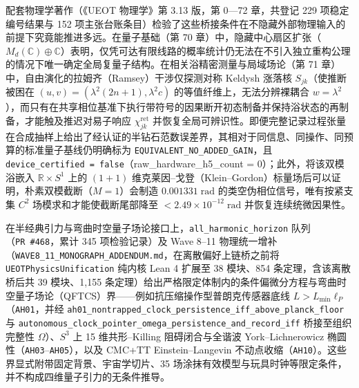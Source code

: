 \documentclass[
  11pt,
  oneside]{book}
\begin{document}
配套物理学著作（《UEOT 物理学》第 3.13 版，第 0---72 章，共登记 229 项稳定编号结果与 152 项主张台账条目）检验了这些桥接条件在不隐藏外部物理输入的前提下究竟能推进多远。在量子基础（第 70 章）中，隐藏中心扇区扩张（\(M_d(\mathbb{C}) \oplus \mathbb{C}\)）表明，仅凭可达有限线路的概率统计仍无法在不引入独立重构公理的情况下唯一确定全局复量子结构。在相关浴精密测量与局域场论（第 71 章）中，自由演化的拉姆齐（Ramsey）干涉仅探测对称 Keldysh 涨落核 \(S_{jk}\)（使推断被困在 \((u, v) = (\lambda^2(2n+1), \lambda^2 c)\) 的等值纤维上，无法分辨裸耦合 \(w = \lambda^2\)），而只有在共享相位基准下执行带符号的因果断开初态制备并保持浴状态的再制备，才能触及推迟对易子响应 \(\chi^{\mathrm{ret}}_{jk}\) 并恢复全局可辨识性。即便完整记录过程张量在合成抽样上给出了经认证的半钻石范数误差界，其相对于同信息、同操作、同预算的标准量子基线仍明确标为 \texttt{EQUIVALENT\_NO\_ADDED\_GAIN}，且 \texttt{device\_certified\ =\ false}（raw\_hardware\_h5\_count = 0）；此外，将该双模浴嵌入 \(\mathbb{R} \times S^1\) 上的 \((1+1)\) 维克莱因--戈登（Klein--Gordon）标量场后可以证明，朴素双模截断（\(M=1\)）会制造 \(0.001331\;\mathrm{rad}\) 的类空伪相位信号，唯有按紧支集 \(C^2\) 场模求和才能使截断尾部降至 \(< 2.49 \times 10^{-12}\;\mathrm{rad}\) 并恢复连续统微因果性。

在半经典引力与弯曲时空量子场论接口上，\texttt{all\_harmonic\_horizon} 队列（\texttt{PR\ \#468}，累计 345 项检验记录）及 Wave 8--11 物理统一增补（\nolinkurl{WAVE8_11_MONOGRAPH_ADDENDUM.md}，在离散偏好上链桥之前将 \texttt{UEOTPhysicsUnification} 纯内核 Lean 4 扩展至 38 模块、854 条定理，含该离散桥后共 39 模块、1,155 条定理）给出严格限定体制内的条件偏微分方程与弯曲时空量子场论（QFTCS）界------例如抗压缩操作型普朗克传感器底线 \(L > L_{\min}\ell_P\)（\texttt{AH01}，并经 \nolinkurl{ah01_nontrapped_clock_persistence_iff_above_planck_floor} 与 \nolinkurl{autonomous_clock_pointer_omega_persistence_and_record_iff} 桥接至组织完整性 \(\Omega\)）、\(S^3\) 上 15 维共形--Killing 阻碍闭合与全谐波 York--Lichnerowicz 椭圆性（\texttt{AH03}--\texttt{AH05}），以及 CMC+TT Einstein--Langevin 不动点收缩（\texttt{AH10}）。这些界显式附带固定背景、宇宙学切片、35 场涂抹有效模型与玩具时钟等限定条件，并不构成四维量子引力的无条件推导。
\end{document}
